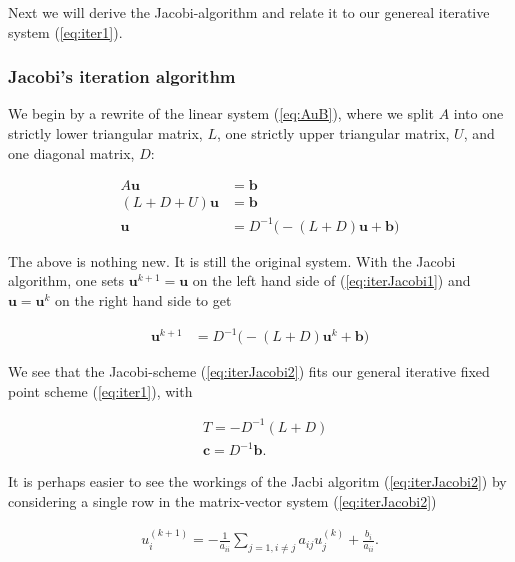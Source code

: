 \documentclass{article}
\begin{document}
Next we will derive the Jacobi-algorithm and relate it to our genereal iterative system (\ref{eq:iter1}).

\subsubsection{Jacobi's iteration algorithm}
We begin by a rewrite of the linear system (\ref{eq:AuB}), where we split $A$ into one strictly lower triangular matrix, $L$, one strictly upper triangular matrix, $U$, and one diagonal matrix, $D$:

\begin{subequations}
	\begin{align}
		A \mathbf{u} &= \mathbf{b}\\
		(L + D + U) \mathbf{u} &= \mathbf{b}\\
		\mathbf{u} &= D^{-1} \Big(-(L+D) \mathbf{u} + \mathbf{b}\Big)\label{eq:iterJacobi1}
	\end{align}
\end{subequations}

The above is nothing new. It is still the original system. With the Jacobi algorithm, one sets $\mathbf{u}^{k+1} = \mathbf{u}$ on the left hand side of (\ref{eq:iterJacobi1}) and $\mathbf{u} = \mathbf{u}^k$ on the right hand side to get

\begin{subequations}
	\begin{align}
	\mathbf{u}^{k+1}  &= D^{-1} \Big(-(L+D) \mathbf{u}^k + \mathbf{b}\Big)\label{eq:iterJacobi2}
	\end{align}
\end{subequations}

We see that the Jacobi-scheme (\ref{eq:iterJacobi2}) fits our general iterative fixed point scheme (\ref{eq:iter1}), with

\begin{subequations}\label{eq:jacobiFixed}
	\begin{align}
		&T = -D^{-1}(L+D)\\
		&\mathbf{c} = D^{-1} \mathbf{b}.
	\end{align}
\end{subequations}

It is perhaps easier to see the workings of the Jacbi algoritm (\ref{eq:iterJacobi2}) by considering a single row in the matrix-vector system (\ref{eq:iterJacobi2}) 

\begin{subequations}\label{eq:jacobiRow}
	\begin{align}
		u_i^{(k+1)} = - \frac{1}{a_{ii}} \sum_{j=1,i \neq j} a_{ij} u_j^{(k)} + \frac{b_i}{a_{ii}}.
	\end{align}
\end{subequations}
\end{document}
